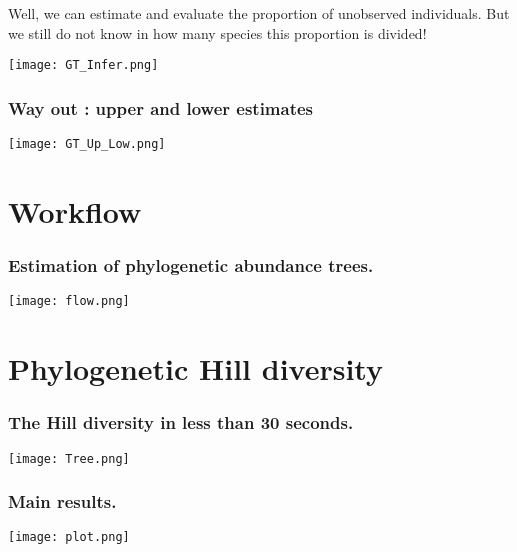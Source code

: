 \documentclass[10pt]{beamer}
\begin{document}
\begin{frame}
\begin{center}
Well, we can estimate and evaluate the proportion of unobserved individuals.
But we still do not know in how many species this proportion is divided!
\end{center}
\begin{center}
       \texttt{[image: GT\_Infer.png]}
	\end{center}
\end{frame}

\begin{frame}
\frametitle{Way out : upper and lower estimates}

	\begin{center}
       \texttt{[image: GT\_Up\_Low.png]}
	\end{center}
\end{frame}

\section{Workflow}
\frametitle{Estimation of phylogenetic abundance trees.}
\begin{frame}

	\begin{center}
       \texttt{[image: flow.png]}
	\end{center}

\end{frame}


\section{Phylogenetic Hill diversity}
\frametitle{The Hill diversity in less than 30 seconds.}

\begin{frame}
	\begin{center}
       \texttt{[image: Tree.png]}\\

	\end{center}
\end{frame}



\begin{frame}
\frametitle{Main results.}
	\begin{center}
       \texttt{[image: plot.png]}
	\end{center}
\end{frame}
\end{document}
